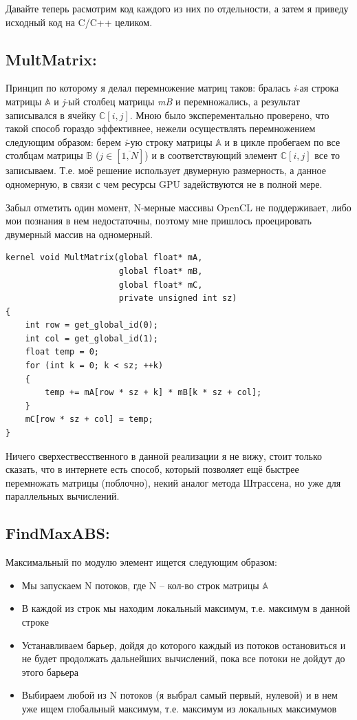 \documentclass[utf8, 12pt, a4paper, oneside]{article}
\begin{document}
Давайте теперь расмотрим код каждого из них по отдельности, а затем я приведу исходный код на C/C++ целиком.

\subsection*{MultMatrix:}
Принцип по которому я делал перемножение матриц таков:
бралась \textit{i}-ая строка матрицы $\mathbb{A}$ и \textit{j}-ый столбец матрицы \textit{mB} и перемножались, а результат записывался в ячейку $\mathbb{C}[i,j]$. Мною было эксперементально проверено, что такой способ гораздо эффективнее, нежели осуществлять перемножением следующим образом:
берем \textit{i}-ую строку матрицы $\mathbb{A}$ и в цикле пробегаем по все столбцам матрицы $\mathbb{B}$ ($j\in[\overline{1,N}]$) и в соответствующий элемент $\mathbb{C}[i,j]$ все то записываем. Т.е. моё решение использует двумерную размерность, а данное одномерную, в связи с чем ресурсы GPU задействуются не в полной мере.

Забыл отметить один момент, N-мерные массивы OpenCL не поддерживает, либо мои познания в нем недостаточны, поэтому мне пришлось проецировать двумерный массив на одномерный.
\begin{lstlisting}
kernel void MultMatrix(global float* mA,
                       global float* mB,
                       global float* mC,
                       private unsigned int sz)
{
    int row = get_global_id(0);
    int col = get_global_id(1);
    float temp = 0;
    for (int k = 0; k < sz; ++k)
    {
        temp += mA[row * sz + k] * mB[k * sz + col];
    }
    mC[row * sz + col] = temp;
}
\end{lstlisting}

Ничего сверхествесственного в данной реализации я не вижу, стоит только сказать, что в интернете есть способ, который позволяет ещё быстрее перемножать матрицы (поблочно), некий аналог метода Штрассена, но уже для параллельных вычислений.

\subsection*{FindMaxABS:}
Максимальный по модулю элемент ищется следующим образом:
\begin{itemize}
\item Мы запускаем N потоков, где N -- кол-во строк матрицы $\mathbb{A}$
\item В каждой из строк мы находим локальный максимум, т.е. максимум в данной строке
\item Устанавливаем барьер, дойдя до которого каждый из потоков остановиться и не будет продолжать дальнейших вычислений, пока все потоки не дойдут до этого барьера
\item Выбираем любой из N потоков (я выбрал самый первый, нулевой) и в нем уже ищем глобальный максимум, т.е. максимум из локальных максимумов
\end{itemize}
\end{document}
